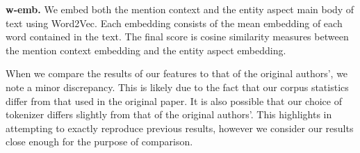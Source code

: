 \textbf{w-emb. }  We embed both the mention context and the entity aspect main body of text using Word2Vec. Each embedding consists of the mean embedding of each word contained in the text. The final score is cosine similarity measures between the mention context embedding and the entity aspect embedding. 


 When we compare the results of our features to that of the original authors', we note a minor discrepancy. This is likely due to the fact that our corpus statistics differ from that used in the original paper. It is also possible that our choice of tokenizer differs slightly from that of the original authors'. This highlights in attempting to exactly reproduce previous results, however we consider our results close enough for the purpose of comparison.